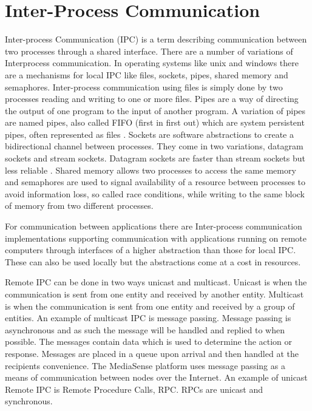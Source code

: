 \section{Inter-Process Communication}
Inter-process Communication (IPC) is a term describing communication between two processes through a shared interface. There are a number of variations of Interprocess communication. In operating systems like unix and windows there are a mechanisms for local IPC like files, sockets, pipes, shared memory and semaphores. 
Inter-process communication using files is simply done by two processes reading and writing to one or more files. Pipes are a way of directing the output of one program to the input of another program. A variation of pipes are named pipes, also called FIFO (first in first out) which are system persistent pipes, often represented as files \cite{Lewandowski97interprocesscommunication}. Sockets are software abstractions to create a bidirectional channel between processes. They come in two variations, datagram sockets and stream sockets. Datagram sockets are faster than stream sockets but less reliable \cite{Lewandowski97interprocesscommunication}. Shared memory allows two processes to access the same memory and semaphores are used to signal availability of a resource between processes to avoid information loss, so called race conditions, while writing to the same block of memory from two different processes.

For communication between applications there are Inter-process communication implementations supporting communication with applications running on remote computers through interfaces of a higher abstraction than those for local IPC. These can also be used locally but the abstractions come at a cost in resources.

Remote IPC can be done in two ways unicast and multicast. Unicast is when the communication is sent from one entity and received by another entity. Multicast is when the communication is sent from one entity and received by a group of entities.
An example of multicast IPC is message passing. Message passing is asynchronous and as such the message will be handled and replied to when possible. The messages contain data which is used to determine the action or response. Messages are placed in a queue upon arrival and then handled at the recipients convenience. The MediaSense platform uses message passing as a means of communication between nodes over the Internet.
An example of unicast Remote IPC is Remote Procedure Calls, RPC. RPCs are unicast and synchronous.

